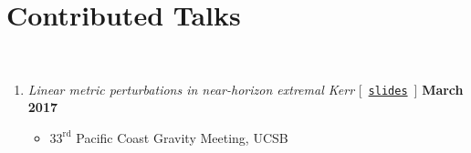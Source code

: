 
\section*{\sc Contributed Talks}~
\vspace{-.2in}

\begin{enumerate}

    \item {\it Linear metric perturbations in near-horizon extremal Kerr}
    [~\href{http://fermionic.me/talk-slides/NHEK%40PCGM.pdf}{{\tt slides}}~] \hfill {\bf March 2017} 
    \begin{itemize}
     \item[] $33^\mathrm{rd}$ Pacific Coast Gravity Meeting, UCSB
    \end{itemize}
    

\end{enumerate}
